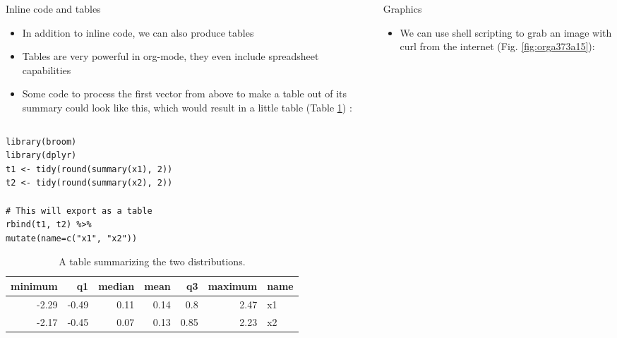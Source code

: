 \documentclass[final]{beamer}
\begin{document}
\begin{frame}[fragile,label={sec:org10a116a}]{}
\begin{columns}
\begin{column}[t]{0.45\columnwidth}
\begin{block}{Inline code and tables}
\begin{itemize}
\item In addition to inline code, we can also produce tables
\item Tables are very powerful in org-mode, they even include spreadsheet
capabilities
\item Some code to process the first vector from above to make a table out
of its summary could look like this, which would result in a little
table (Table \ref{tab:orgfdd29a9}) :
\end{itemize}

\begin{columns}
\begin{column}[T]{0.88\columnwidth}
\begin{verbatim}
library(broom)
library(dplyr)
t1 <- tidy(round(summary(x1), 2)) 
t2 <- tidy(round(summary(x2), 2))

# This will export as a table
rbind(t1, t2) %>%
mutate(name=c("x1", "x2"))
\end{verbatim}

\vspace{2cm}

\begin{table}[htbp]
\centering
\begin{tabular}{rrrrrrl}
\hline
minimum & q1 & median & mean & q3 & maximum & name\\
\hline
-2.29 & -0.49 & 0.11 & 0.14 & 0.8 & 2.47 & x1\\
-2.17 & -0.45 & 0.07 & 0.13 & 0.85 & 2.23 & x2\\
\hline
\end{tabular}
\caption{\label{tab:orgfdd29a9}
A table summarizing the two distributions.}

\end{table}
\end{column}
\end{columns}
\end{block}
\end{column}

\begin{column}[t]{0.45\columnwidth}
\begin{block}{Graphics}
\begin{itemize}
\item We can use shell scripting to grab an image with curl from the
internet (Fig. \ref{fig:orga373a15}):
\end{itemize}


\end{block}
\end{column}
\end{columns}
\end{frame}
\end{document}
